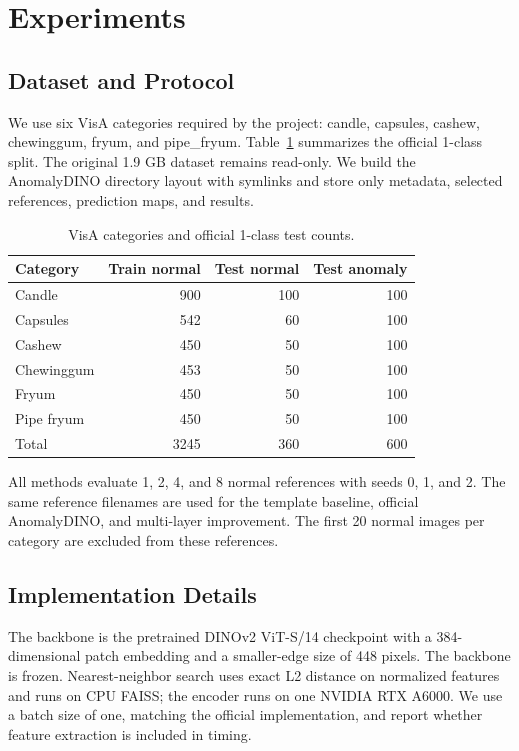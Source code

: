\section{Experiments}

\subsection{Dataset and Protocol}
We use six VisA categories required by the project: candle, capsules, cashew,
chewinggum, fryum, and pipe\_fryum. Table~\ref{tab:dataset} summarizes the
official 1-class split. The original 1.9 GB dataset remains read-only. We build
the AnomalyDINO directory layout with symlinks and store only metadata,
selected references, prediction maps, and results.

\begin{table}[t]
\centering
\small
\caption{VisA categories and official 1-class test counts.}
\label{tab:dataset}
\begin{tabular}{lrrr}
\toprule
Category & Train normal & Test normal & Test anomaly \\
\midrule
Candle      & 900 & 100 & 100 \\
Capsules    & 542 & 60  & 100 \\
Cashew      & 450 & 50  & 100 \\
Chewinggum  & 453 & 50  & 100 \\
Fryum       & 450 & 50  & 100 \\
Pipe fryum  & 450 & 50  & 100 \\
\midrule
Total       & 3245 & 360 & 600 \\
\bottomrule
\end{tabular}
\end{table}

All methods evaluate 1, 2, 4, and 8 normal references with seeds 0, 1, and 2.
The same reference filenames are used for the template baseline, official
AnomalyDINO, and multi-layer improvement. The first 20 normal images per
category are excluded from these references.

\subsection{Implementation Details}
The backbone is the pretrained DINOv2 ViT-S/14 checkpoint with a 384-dimensional
patch embedding and a smaller-edge size of 448 pixels. The backbone is frozen.
Nearest-neighbor search uses exact L2 distance on normalized features and runs
on CPU FAISS; the encoder runs on one NVIDIA RTX A6000. We use a batch size of
one, matching the official implementation, and report whether feature
extraction is included in timing.

